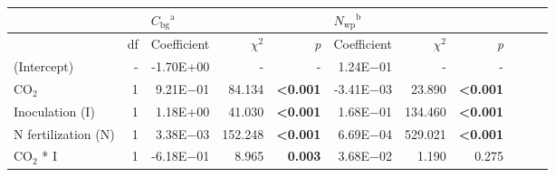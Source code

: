 \begin{landscape}
\begin{table}
{\begin{tabular}{p{3cm}p{0.5cm}p{1.75cm}p{1.5cm}p{1.5cm}p{1.75cm}p{1.5cm}p{1.5cm}p{1.75cm}p{1.5cm}p{1.5cm}}
            &&  \multicolumn{3}{l}{$C_\mathrm{bg}{}^\mathrm{a}$} 
            &   \multicolumn{3}{l}{$N_\mathrm{wp}{}^\mathrm{b}$} 
            &&& \\
            \hline
            & \multicolumn{1}{r}{df}
            & \multicolumn{1}{r}{Coefficient}   & \multicolumn{1}{r}{$\chi^2$}    & \multicolumn{1}{r}{\textit{p}} 
            & \multicolumn{1}{r}{Coefficient}   & \multicolumn{1}{r}{$\chi^2$}    & \multicolumn{1}{r}{\textit{p}} 
            \\
            \hline

            (Intercept) & \multicolumn{1}{r}{-}
            & \multicolumn{1}{r}{-1.70E+00}     & \multicolumn{1}{r}{-}             & \multicolumn{1}{r}{-}
            & \multicolumn{1}{r}{1.24E$-$01}    & \multicolumn{1}{r}{-}             & \multicolumn{1}{r}{-}
            &&&
            \\

            CO$_2$ & \multicolumn{1}{r}{1}
            & \multicolumn{1}{r}{9.21E$-$01}    & \multicolumn{1}{r}{84.134}        & \multicolumn{1}{r}{\textbf{<0.001}}
            & \multicolumn{1}{r}{-3.41E$-$03}   & \multicolumn{1}{r}{23.890}        & \multicolumn{1}{r}{\textbf{<0.001}}
            &&&
            \\

            Inoculation (I) & \multicolumn{1}{r}{1}
            & \multicolumn{1}{r}{1.18E+00}      & \multicolumn{1}{r}{41.030}        & \multicolumn{1}{r}{\textbf{<0.001}}
            & \multicolumn{1}{r}{1.68E$-$01}    & \multicolumn{1}{r}{134.460}       & \multicolumn{1}{r}{\textbf{<0.001}}
            &&&
            \\

            N fertilization (N) & \multicolumn{1}{r}{1}
            & \multicolumn{1}{r}{3.38E$-$03}    & \multicolumn{1}{r}{152.248}       & \multicolumn{1}{r}{\textbf{<0.001}}
            & \multicolumn{1}{r}{6.69E$-$04}    & \multicolumn{1}{r}{529.021}       & \multicolumn{1}{r}{\textbf{<0.001}}
            &&&
            \\

            CO$_2$ * I & \multicolumn{1}{r}{1}
            & \multicolumn{1}{r}{-6.18E$-$01}   & \multicolumn{1}{r}{8.965}         & \multicolumn{1}{r}{\textbf{0.003}}
            & \multicolumn{1}{r}{3.68E$-$02}    & \multicolumn{1}{r}{1.190}         & \multicolumn{1}{r}{0.275}
            &&& \multicolumn{1}{r}{}
            \\


\end{tabular}}
\end{table}
\end{landscape}
